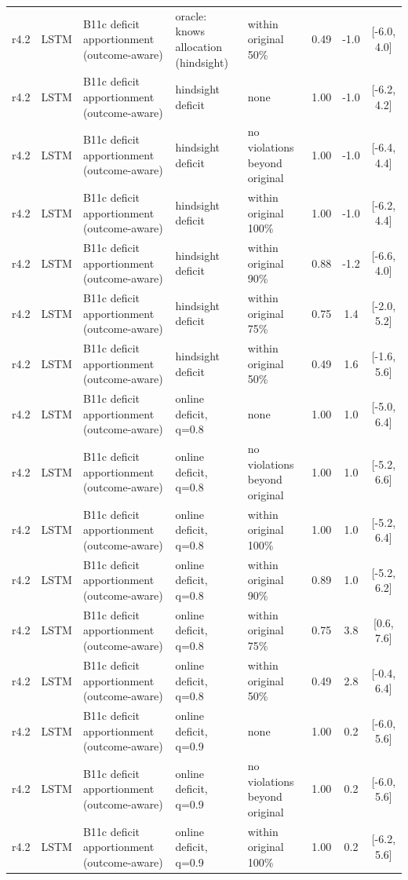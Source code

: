 \documentclass[10pt,onecolumn,letterpaper]{article}
\begin{document}
\begin{longtable}{lllp{4.2cm}p{3.4cm}ccc}
r4.2 & LSTM & B11c deficit apportionment (outcome-aware) & oracle: knows allocation (hindsight) & within original 50\% & 0.49 & -1.0 & [-6.0, 4.0] \\
r4.2 & LSTM & B11c deficit apportionment (outcome-aware) & hindsight deficit & none & 1.00 & -1.0 & [-6.2, 4.2] \\
r4.2 & LSTM & B11c deficit apportionment (outcome-aware) & hindsight deficit & no violations beyond original & 1.00 & -1.0 & [-6.4, 4.4] \\
r4.2 & LSTM & B11c deficit apportionment (outcome-aware) & hindsight deficit & within original 100\% & 1.00 & -1.0 & [-6.2, 4.4] \\
r4.2 & LSTM & B11c deficit apportionment (outcome-aware) & hindsight deficit & within original 90\% & 0.88 & -1.2 & [-6.6, 4.0] \\
r4.2 & LSTM & B11c deficit apportionment (outcome-aware) & hindsight deficit & within original 75\% & 0.75 & 1.4 & [-2.0, 5.2] \\
r4.2 & LSTM & B11c deficit apportionment (outcome-aware) & hindsight deficit & within original 50\% & 0.49 & 1.6 & [-1.6, 5.6] \\
r4.2 & LSTM & B11c deficit apportionment (outcome-aware) & online deficit, q=0.8 & none & 1.00 & 1.0 & [-5.0, 6.4] \\
r4.2 & LSTM & B11c deficit apportionment (outcome-aware) & online deficit, q=0.8 & no violations beyond original & 1.00 & 1.0 & [-5.2, 6.6] \\
r4.2 & LSTM & B11c deficit apportionment (outcome-aware) & online deficit, q=0.8 & within original 100\% & 1.00 & 1.0 & [-5.2, 6.4] \\
r4.2 & LSTM & B11c deficit apportionment (outcome-aware) & online deficit, q=0.8 & within original 90\% & 0.89 & 1.0 & [-5.2, 6.2] \\
r4.2 & LSTM & B11c deficit apportionment (outcome-aware) & online deficit, q=0.8 & within original 75\% & 0.75 & 3.8 & [0.6, 7.6] \\
r4.2 & LSTM & B11c deficit apportionment (outcome-aware) & online deficit, q=0.8 & within original 50\% & 0.49 & 2.8 & [-0.4, 6.4] \\
r4.2 & LSTM & B11c deficit apportionment (outcome-aware) & online deficit, q=0.9 & none & 1.00 & 0.2 & [-6.0, 5.6] \\
r4.2 & LSTM & B11c deficit apportionment (outcome-aware) & online deficit, q=0.9 & no violations beyond original & 1.00 & 0.2 & [-6.0, 5.6] \\
r4.2 & LSTM & B11c deficit apportionment (outcome-aware) & online deficit, q=0.9 & within original 100\% & 1.00 & 0.2 & [-6.2, 5.6] \\

\end{longtable}
\end{document}
